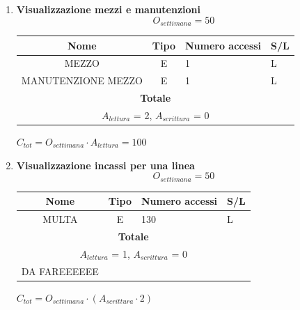 \documentclass[12pt,a4paper]{report}
\begin{document}
\begin{enumerate}[label=\textbf{\arabic*)}]
    \item \textbf{Visualizzazione mezzi e manutenzioni} \\
    \[ {O_{settimana} = 50} \]
    \begin{table}[H]
    \centering
    \begin{tabular}{|c|c|l|l|}
    \hline
    \textbf{Nome} & \textbf{Tipo} & \textbf{Numero accessi} & \textbf{S/L} \\
    \hline
    MEZZO & E & 1 & L \\
    \hline
    MANUTENZIONE MEZZO & E & 1 & L \\
    \hline
    \multicolumn{4}{c}{\textbf{Totale}} \\    
    \multicolumn{4}{c}{${A_{lettura}}$ = 2, ${A_{scrittura}}$ = 0} \\
    \hline
    \end{tabular}
    \end{table}
    \begin{center}
    ${C_{tot} = {O_{settimana}}\cdot{A_{lettura}} = 100}$
    \end{center}

    \item \textbf{Visualizzazione incassi per una linea} \\
    \[ {O_{settimana} = 50} \]
    \begin{table}[H]
    \centering
    \begin{tabular}{|c|c|l|l|}
    \hline
    \textbf{Nome} & \textbf{Tipo} & \textbf{Numero accessi} & \textbf{S/L} \\
    \hline
    MULTA & E & 130 & L \\
    \hline
    \multicolumn{4}{c}{\textbf{Totale}} \\    
    \multicolumn{4}{c}{${A_{lettura}}$ = 1, ${A_{scrittura}}$ = 0} \\
    \hline
    DA FAREEEEEE
    \end{tabular}
    \end{table}
    \begin{center}
    ${C_{tot} = {O_{settimana}}\cdot({A_{scrittura}}\cdot 2)}$
    \end{center}


\end{enumerate}
\end{document}
